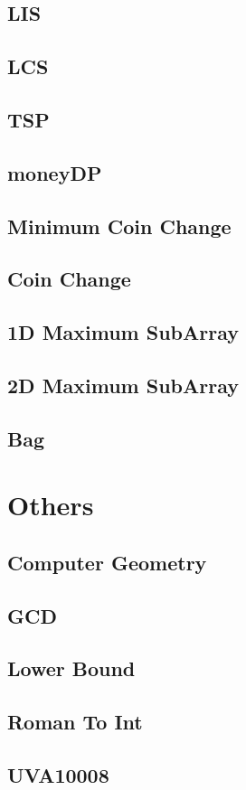 \subsection{LIS}

\subsection{LCS}

\subsection{TSP}

\subsection{moneyDP}

\subsection{Minimum Coin Change}

\subsection{Coin Change}

\subsection{1D Maximum SubArray}

\subsection{2D Maximum SubArray}

\subsection{Bag}


\section{Others}
\subsection{Computer Geometry}

\subsection{GCD}

\subsection{Lower Bound}

\subsection{Roman To Int}

\subsection{UVA10008}
